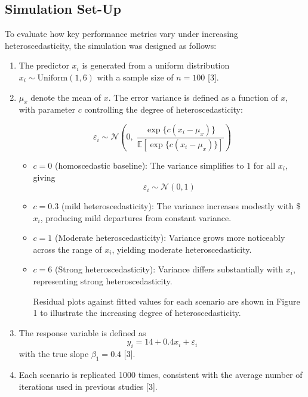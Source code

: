 \documentclass[
  twocolumn]{article}
\begin{document}
\subsection{Simulation Set-Up}\label{simulation-set-up}

To evaluate how key performance metrics vary under increasing heteroscedasticity, the simulation was designed as follows:

\begin{enumerate}
\def\labelenumi{\arabic{enumi}.}
\item
  The predictor \(x_i\) is generated from a uniform distribution \(x_i \sim \text{Uniform}(1, 6)\) with a sample size of \(n = 100\) {[}3{]}.
\item
  \(\mu_x\) denote the mean of \(x\). The error variance is defined as a function of \(x\), with parameter \(c\) controlling the degree of heteroscedasticity:

  \[
  \varepsilon_i \sim \mathcal{N}\!\left(0,\;
  \frac{\exp\{c(x_i - \mu_x)\}}
  {\mathbb{E}\!\left[\exp\{c(x_i - \mu_x)\}\right]}\right)
  \]

  \begin{itemize}
  \item
    \(c=0\) (homoscedastic baseline): The variance simplifies to \(1\) for all \(x_i\), giving\[
    \varepsilon_i \sim \mathcal{N}(0,1)
    \]
  \item
    \(c=0.3\) (mild heteroscedasticity): The variance increases modestly with \$\(x_i\), producing mild departures from constant variance.
  \item
    \(c=1\) (Moderate heteroscedasticity): Variance grows more noticeably across the range of \(x_i\), yielding moderate heteroscedasticity.
  \item
    \(c=6\) (Strong heteroscedasticity): Variance differs substantially with \(x_i\), representing strong heteroscedasticity.

    Residual plots against fitted values for each scenario are shown in Figure 1 to illustrate the increasing degree of heteroscedasticity.
  \end{itemize}
\item
  The response variable is defined as\\
  \[
  y_i = 14 + 0.4x_i + \varepsilon_i
  \] with the true slope \(\beta_1 = 0.4\) {[}3{]}.
\item
  Each scenario is replicated 1000 times, consistent with the average number of iterations used in previous studies {[}3{]}.
\end{enumerate}
\end{document}
